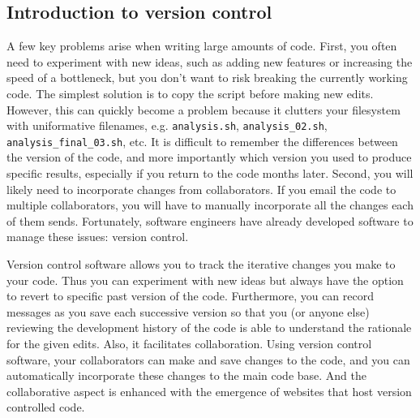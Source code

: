 \subsection{Introduction to version control}

A few key problems arise when writing large amounts of code. First, you often need to experiment with new ideas, such as adding new features or increasing the speed of a bottleneck, but you don't want to risk breaking the currently working code. The simplest solution is to copy the script before making new edits. However, this can quickly become a problem because it clutters your filesystem with uniformative filenames, e.g. \verb|analysis.sh|, \verb|analysis_02.sh|, \verb|analysis_final_03.sh|, etc. It is difficult to remember the differences between the version of the code, and more importantly which version you used to produce specific results, especially if you return to the code months later. Second, you will likely need to incorporate changes from collaborators. If you email the code to multiple collaborators, you will have to manually incorporate all the changes each of them sends. Fortunately, software engineers have already developed software to manage these issues: version control.

Version control software allows you to track the iterative changes you make to your code. Thus you can experiment with new ideas but always have the option to revert to specific past version of the code. Furthermore, you can record messages as you save each successive version so that you (or anyone else) reviewing the development history of the code is able to understand the rationale for the given edits. Also, it facilitates collaboration. Using version control software, your collaborators can make and save changes to the code, and you can automatically incorporate these changes to the main code base. And the collaborative aspect is enhanced with the emergence of websites that host version controlled code.
